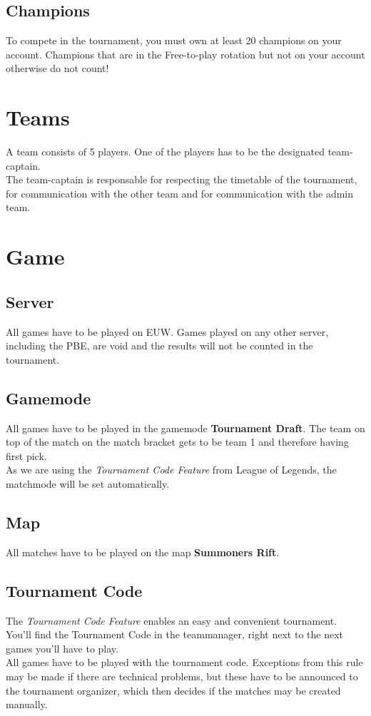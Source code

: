 \documentclass{article}
\begin{document}
\subsection{Champions}
To compete in the tournament, you must own at least 20 champions on your account. Champions that are in the Free-to-play rotation but not on your account otherwise do not count!


\section{Teams}
A team consists of 5 players. One of the players has to be the designated team-captain.
\\
The team-captain is responsable for respecting the timetable of the tournament, for communication with the other team and for communication with the admin team.

\section{Game}
\subsection{Server}
All games have to be played on EUW. Games played on any other server, including the PBE, are void and the results will not be counted in the tournament.

\subsection{Gamemode}
All games have to be played in the gamemode \textbf{Tournament Draft}. The team on top of the match on the match bracket gets to be team 1 and therefore having first pick. 
\\
As we are using the \textit{Tournament Code Feature} from League of Legends, the matchmode will be set automatically.
\subsection{Map}
All matches have to be played on the map \textbf{Summoners Rift}.

\subsection{Tournament Code}
The \textit{Tournament Code Feature} enables an easy and convenient tournament. You'll find the Tournament Code in the teammanager, right next to the next games you'll have to play. 
\\
All games have to be played with the tournament code. Exceptions from this rule may be made if there are technical problems, but these have to be announced to the tournament organizer, which then decides if the matches may be created manually.
\end{document}
